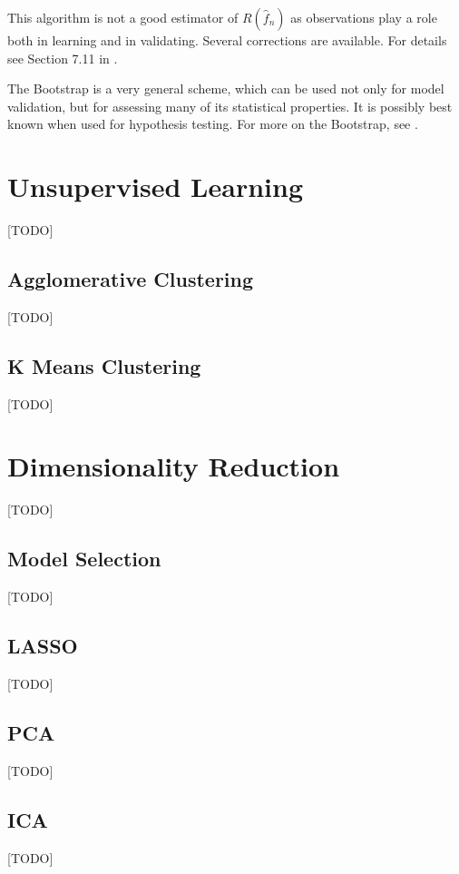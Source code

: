 \documentclass[12pt,a4paper]{article}
\theoremstyle{plain}
\theoremstyle{definition}
\newcommand{\risk}{R}
\newcommand{\hyp}{f}
\newcommand{\EPE}{\risk(\hat{\hyp}_n)}
\begin{document}
This algorithm is not a good estimator of $\EPE$ as observations play a role both in learning and in validating. 
Several corrections are available. For details see Section 7.11 in \cite{hastie_elements_2003}.

The Bootstrap is a very general scheme, which can be used not only for model validation, but for assessing many of its statistical properties. It is possibly best known when used for hypothesis testing. 
For more on the Bootstrap, see \cite{efron_introduction_1994}.






\section{Unsupervised Learning}
\label{sec:unsupervised}
[TODO]


\subsection{Agglomerative Clustering}
[TODO]

\subsection{K Means Clustering}
[TODO]



\section{Dimensionality Reduction}
\label{sec:dim_reduce}
[TODO]

\subsection{Model Selection}
[TODO]

\subsection{LASSO}
[TODO]

\subsection{PCA}
[TODO]

\subsection{ICA}
[TODO]
\end{document}
